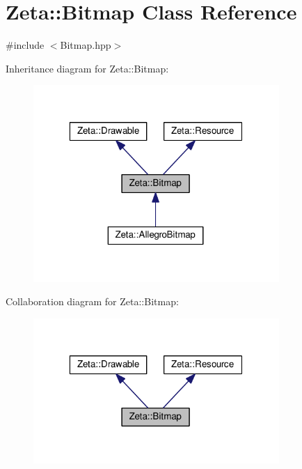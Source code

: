\hypertarget{classZeta_1_1Bitmap}{\section{Zeta\+:\+:Bitmap Class Reference}
\label{classZeta_1_1Bitmap}
}


{\ttfamily \#include $<$Bitmap.\+hpp$>$}



Inheritance diagram for Zeta\+:\+:Bitmap\+:\nopagebreak
\begin{figure}[H]
\begin{center}
\leavevmode
\includegraphics[width=265pt]{classZeta_1_1Bitmap__inherit__graph}
\end{center}
\end{figure}


Collaboration diagram for Zeta\+:\+:Bitmap\+:\nopagebreak
\begin{figure}[H]
\begin{center}
\leavevmode
\includegraphics[width=265pt]{classZeta_1_1Bitmap__coll__graph}
\end{center}
\end{figure}
